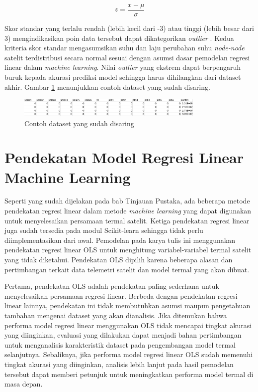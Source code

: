 \begin{equation}
\label{eq:zscore}
	z = \frac{x - \mu}{\sigma}
\end{equation}

Skor standar yang terlalu rendah (lebih kecil dari -3) atau tinggi (lebih besar
dari 3) mengindikasikan poin data tersebut dapat dikategorikan \textit{outlier}
\cite{boschetti2015}. Kedua kriteria skor standar mengasumsikan suhu dan laju
perubahan suhu \textit{node-node} satelit terdistribusi secara normal sesuai
dengan asumsi dasar pemodelan regresi linear dalam \textit{machine learning}.
Nilai \textit{outlier} yang ekstrem dapat berpengaruh buruk kepada akurasi
prediksi model sehingga harus dihilangkan dari dataset akhir. Gambar
\ref{fig:cleandataset} menunjukkan contoh dataset yang sudah disaring.

\begin{figure}[H]
\setlength{}
\begin{center}
\includegraphics[width=0.8\textwidth]{fig/cleandataset.png}
\caption{Contoh dataset yang sudah disaring}
\label{fig:cleandataset}
\end{center}
\end{figure}

\section{Pendekatan Model Regresi Linear Machine Learning}

Seperti yang sudah dijelakan pada bab Tinjauan Pustaka, ada beberapa metode
pendekatan regresi linear dalam metode \textit{machine learning} yang dapat
digunakan untuk menyelesaikan persamaan termal satelit. Ketiga pendekatan
regresi linear juga sudah tersedia pada modul Scikit-learn sehingga tidak perlu
diimplementasikan dari awal. Pemodelan pada karya tulis ini menggunakan
pendekatan regresi linear OLS untuk menghitung variabel-variabel termal satelit
yang tidak diketahui. Pendekatan OLS dipilih karena beberapa alasan dan
pertimbangan terkait data telemetri satelit dan model termal yang akan dibuat. 

Pertama, pendekatan OLS adalah pendekatan paling sederhana untuk menyelesaikan
persamaan regresi linear. Berbeda dengan pendekatan regresi linear lainnya,
pendekatan ini tidak membutuhkan asumsi maupun pengetahuan tambahan mengenai
dataset yang akan dianalisis. Jika ditemukan bahwa performa model regresi
linear menggunakan OLS tidak mencapai tingkat akurasi yang diinginkan, evaluasi
yang dilakukan dapat menjadi bahan pertimbangan untuk menganalisis
karakteristik dataset pada pengembangan model termal selanjutnya. Sebaliknya,
jika performa model regresi linear OLS sudah memenuhi tingkat akurasi yang
diinginkan, analisis lebih lanjut pada hasil pemodelan tersebut dapat memberi
petunjuk untuk meningkatkan performa model termal di masa depan.

